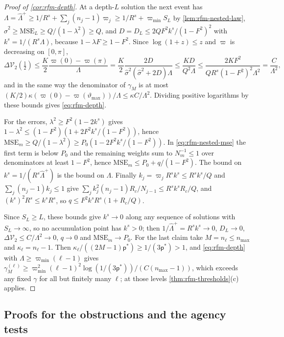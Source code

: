 \begin{proof}[Proof of \cref{cor:rfm-depth}]
At a depth-$L$ solution the next event has $\Lambda=\hat\Lambda^+\ge1/R^s+\sum_j(n_j-1)\varpi_j\ge1/R^s+\varpi_{\min}S_L$ by \cref{lem:rfm-nested-law}, $\hat\sigma^2\ge\mathrm{MSE}_L\ge Q/(1-\lambda^2)\ge Q$, and $D=D_L\le2QF^2k^s/(1-F^2)^2$ with $k^s=1/(R^s\Lambda)$, because $1-\lambda F\ge1-F^2$. Since $\log(1+z)\le z$ and $\varpi$ is decreasing on $[0,\pi]$,
\begin{equation*}
\Delta\mathcal V_2(\tfrac12)\le\frac K2\frac{\varpi(0)-\varpi(\pi)}{\Lambda}=\frac K2\frac{2D}{\hat\sigma^2(\hat\sigma^2+2D)\Lambda}\le\frac{KD}{Q^2\Lambda}\le\frac{2KF^2}{QR^s(1-F^2)^2\Lambda^2}=\frac{C}{\Lambda^2},
\end{equation*}
and in the same way the denominator of $\gamma_M$ is at most $(K/2)\kappa(\varpi(0)-\varpi(\vartheta_{\max}))/\Lambda\le\kappa C/\Lambda^2$. Dividing positive logarithms by these bounds gives \eqref{eq:rfm-depth}.

For the errors, $\lambda^2\ge F^2(1-2k^s)$ gives $1-\lambda^2\le(1-F^2)(1+2F^2k^s/(1-F^2))$, hence $\mathrm{MSE}_m\ge Q/(1-\lambda^2)\ge P_0(1-2F^2k^s/(1-F^2))$. In \eqref{eq:rfm-nested-mse} the first term is below $P_0$ and the remaining weights sum to $N_m^{-1}\le1$ over denominators at least $1-F^2$, hence $\mathrm{MSE}_m\le P_0+q/(1-F^2)$. The bound on $k^s=1/(R^s\hat\Lambda^+)$ is the bound on $\Lambda$. Finally $k_j=\varpi_jR^sk^s\le R^sk^s/Q$ and $\sum_j(n_j-1)k_j\le1$ give $\sum_jk_j^2(n_j-1)R_c/N_{j-1}\le R^sk^sR_c/Q$, and $(k^s)^2R^s\le k^sR^s$, so $q\le F^2k^sR^s(1+R_c/Q)$.

Since $S_L\ge L$, these bounds give $k^s\to0$ along any sequence of solutions with $S_L\to\infty$, so no accumulation point has $k^s>0$; then $1/\hat\Lambda^+=R^sk^s\to0$, $D_L\to0$, $\Delta\mathcal V_2\le C/\Lambda^2\to0$, $q\to0$ and $\mathrm{MSE}_m\to P_0$. For the last claim take $M=n_\ell\le n_{\max}$ and $\kappa_\ell=n_\ell-1$. Then $\kappa_\ell/((2M-1)\mathsf p^\ast)\ge1/(3\mathsf p^\ast)>1$, and \eqref{eq:rfm-depth} with $\Lambda\ge\varpi_{\min}(\ell-1)$ gives $\gamma_M^{(\ell)}\ge\varpi_{\min}^2(\ell-1)^2\log(1/(3\mathsf p^\ast))/(C(n_{\max}-1))$, which exceeds any fixed $\gamma$ for all but finitely many $\ell$; at those levels \cref{thm:rfm-thresholds}(c) applies.
\end{proof}

\subsection{Proofs for the obstructions and the agency tests}\label{app:rfm-obstructions}

